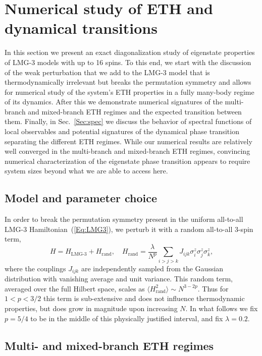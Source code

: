 \documentclass[aps,prx,showpacs,amsmath,amssymb,superscriptaddress,twocolumn,longbibliography,10pt,nofootinbib]{revtex4-2}
\begin{document}
\section{Numerical study of ETH and dynamical transitions \label{Sec:ED}}
In this section we present an exact diagonalization study of eigenstate properties of LMG-3 models with up to 16 spins. To this end, we start with the discussion of the weak perturbation that we add to the LMG-3 model that is thermodynamically irrelevant but breaks the permutation symmetry and allows for numerical study of the system's ETH properties in a fully many-body regime of its dynamics.  After this we demonstrate numerical signatures of the multi-branch and mixed-branch ETH regimes and the expected transition between them. Finally, in Sec.~\ref{Sec:spec} we discuss the behavior of spectral functions of local observables and potential  signatures of the dynamical phase transition separating the different ETH regimes. While our numerical results are relatively well converged in the multi-branch and mixed-branch ETH regimes, convincing numerical characterization of the eigenstate phase transition appears to require system sizes beyond what we are able to access here.
\subsection{Model and parameter choice}
In order to break the permutation symmetry present in the uniform all-to-all LMG-3 Hamiltonian~(\ref{Eq:LMG3}), we perturb it with a random all-to-all 3-spin term,
\begin{equation}\label{Eq:random}
H = H_\text{LMG-3}+ H_\text{rand}, \quad
H_\text{rand} = \frac{\lambda}{N^p}\sum_{i>j>k} J_{ijk} \sigma^z_i \sigma^z_j \sigma^z_k,
\end{equation}
where the couplings $J_{ijk}$ are independently sampled from the Gaussian distribution with vanishing average and unit variance.  This random term, averaged over the full Hilbert space, scales as 
$\langle H_\text{rand}^2\rangle \sim N^{3-2p}$. 
Thus for $1<p< 3/2$ this term is sub-extensive and does not influence thermodynamic properties, but does grow in magnitude upon increasing $N$. In what follows we fix $p=5/4$ to be in the middle of this physically justified interval, and fix $\lambda=0.2$.  


\subsection{Multi- and mixed-branch ETH regimes}
\end{document}
